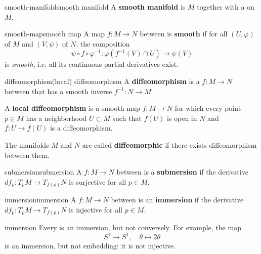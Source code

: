 \begin{topic}{smooth-manifold}{smooth manifold}
    A \textbf{smooth manifold} is  $M$ together with a  on $M$.
\end{topic}

\begin{topic}{smooth-map}{smooth map}
    A map $f \colon M \to N$ between  is \textbf{smooth} if for all  $(U, \varphi)$ of $M$ and $(V, \psi)$ of $N$, the composition
    \[ \psi \circ f \circ \varphi^{-1} \colon \varphi(f^{-1}(V) \cap U) \to \psi(V) \]
    is \textit{smooth}, i.e. all its continuous partial derivatives exist.
\end{topic}

\begin{topic}{diffeomorphism}{(local) diffeomorphism}
    A \textbf{diffeomorphism} is a  $f \colon M \to N$ between  that has a smooth inverse $f^{-1} \colon N \to M$.
    
    A \textbf{local diffeomorphism} is a smooth map $f \colon M \to N$ for which every point $p \in M$ has a neighborhood $U \subset M$ such that $f(U)$ is open in $N$ and $f \colon U \to f(U)$ is a diffeomorphism.
    
    The manifolds $M$ and $N$ are called \textbf{diffeomorphic} if there exists diffeomorphism between them.
\end{topic}

\begin{topic}{submersion}{submersion}
    A  $f \colon M \to N$ between  is a \textbf{submersion} if the derivative $df_p \colon T_p M \to T_{f(p)} N$ is surjective for all $p \in M$.
\end{topic}

\begin{topic}{immersion}{immersion}
    A  $f \colon M \to N$ between  is an \textbf{immersion} if the derivative $df_p \colon T_p M \to T_{f(p)} N$ is injective for all $p \in M$.
\end{topic}

\begin{example}{immersion}
    Every  is an immersion, but not conversely. For example, the map
    \[ S^1 \to S^1, \quad \theta \mapsto 2 \theta  \]
    is an immersion, but not embedding: it is not injective.
\end{example}

